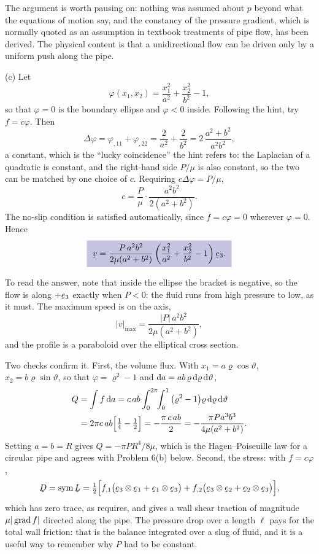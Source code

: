 \begin{solution}
The argument is worth pausing on: nothing was assumed about $p$ beyond
what the equations of motion say, and the constancy of the pressure
gradient, which is normally quoted as an assumption in textbook
treatments of pipe flow, has been derived. The physical content is that
a unidirectional flow can be driven only by a uniform push along the
pipe.

(c) Let
\[
   \varphi(x_{1},x_{2})=\frac{x_{1}^{2}}{a^{2}}
   +\frac{x_{2}^{2}}{b^{2}}-1 ,
\]
so that $\varphi=0$ is the boundary ellipse and $\varphi<0$ inside.
Following the hint, try $f=c\varphi$. Then
\[
   \Delta\varphi=\varphi_{,11}+\varphi_{,22}
   =\frac{2}{a^{2}}+\frac{2}{b^{2}}
   =2\,\frac{a^{2}+b^{2}}{a^{2}b^{2}},
\]
a constant, which is the ``lucky coincidence'' the hint refers to: the
Laplacian of a quadratic is constant, and the right-hand side $P/\mu$ is
also constant, so the two can be matched by one choice of $c$. Requiring
$c\Delta\varphi=P/\mu$,
\[
   c=\frac{P}{\mu}\cdot\frac{a^{2}b^{2}}{2(a^{2}+b^{2})} .
\]
The no-slip condition is satisfied automatically, since $f=c\varphi=0$
wherever $\varphi=0$. Hence
\[
   \boxed{\ \bv=\frac{P\,a^{2}b^{2}}{2\mu(a^{2}+b^{2})}
   \left(\frac{x_{1}^{2}}{a^{2}}+\frac{x_{2}^{2}}{b^{2}}-1\right)
   \be_{3}. \ }
\]

To read the answer, note that inside the ellipse the bracket is
negative, so the flow is along $+\be_{3}$ exactly when $P<0$: the fluid
runs from high pressure to low, as it must. The maximum speed is on the
axis,
\[
   |v|_{\max}=\frac{|P|\,a^{2}b^{2}}{2\mu(a^{2}+b^{2})} ,
\]
and the profile is a paraboloid over the elliptical cross section.

Two checks confirm it. First, the volume flux. With
$x_{1}=a\varrho\cos\vartheta$, $x_{2}=b\varrho\sin\vartheta$, so that
$\varphi=\varrho^{2}-1$ and $\mathrm{d} a=ab\,\varrho\,\mathrm{d}\varrho\,\mathrm{d}\vartheta$,
\[
\begin{aligned}
   Q&=\int f\,\mathrm{d} a
   =c\,ab\int_{0}^{2\pi}\!\!\int_{0}^{1}
     \big(\varrho^{2}-1\big)\varrho\,\mathrm{d}\varrho\,\mathrm{d}\vartheta
   \\
   &=2\pi c\,ab\Big[\tfrac14-\tfrac12\Big]
   =-\frac{\pi\,c\,ab}{2}
   =-\frac{\pi P a^{3}b^{3}}{4\mu(a^{2}+b^{2})} .
\end{aligned}
\]
Setting $a=b=R$ gives $Q=-\pi PR^{4}/8\mu$, which is the
Hagen--Poiseuille law for a circular pipe and agrees with Problem 6(b)
below. Second, the stress: with $f=c\varphi$,
\[
   \bD=\Sym\bL=\tfrac12\Big[f_{,1}
   \big(\be_{3}\otimes\be_{1}+\be_{1}\otimes\be_{3}\big)
   +f_{,2}\big(\be_{3}\otimes\be_{2}+\be_{2}\otimes\be_{3}\big)\Big],
\]
which has zero trace, as  requires, and gives a wall shear
traction of magnitude $\mu|\operatorname{grad} f|$ directed along the pipe. The
pressure drop over a length $\ell$ pays for the total wall friction:
that is the balance  integrated over a slug of fluid, and it
is a useful way to remember why $P$ had to be constant.
\end{solution}

